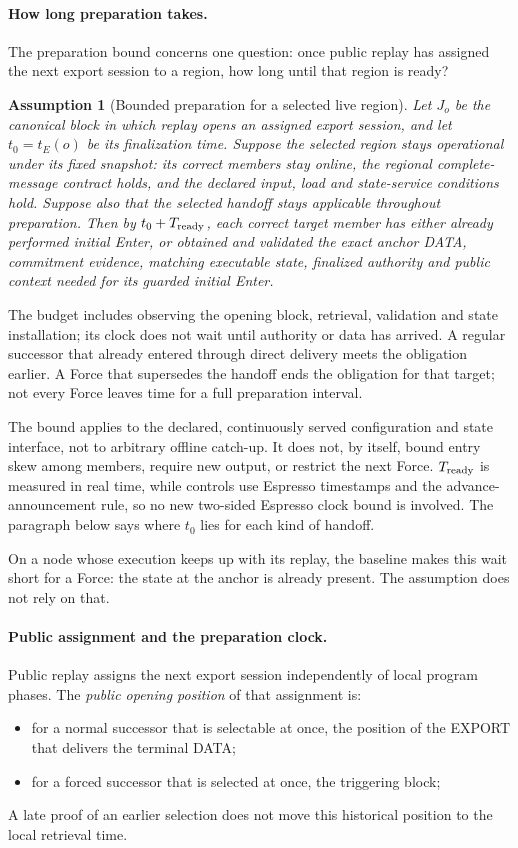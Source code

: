 \documentclass[11pt,a4paper]{article}
\newtheorem{assumption}[assumption]{Assumption}
\begin{document}
\paragraph{How long preparation takes.}
The preparation bound concerns one question: once public replay has
assigned the next export session to a region, how long until that region
is ready?

\begin{assumption}[Bounded preparation for a selected live region]
\label{ass:ready-service}
Let $J_o$ be the canonical block in which replay opens an assigned
export session, and let $t_0=t_E(o)$ be its finalization time.
Suppose the selected region stays operational under its fixed snapshot:
its correct members stay online, the regional complete-message contract
holds, and the declared input, load and state-service conditions hold.
Suppose also that the selected handoff stays applicable throughout
preparation. Then by $t_0+T_{\rm ready}$, each correct target member has
either already performed initial Enter, or obtained and validated the
exact anchor DATA, commitment evidence, matching executable state,
finalized authority and public context needed for its guarded initial
Enter.
\end{assumption}
The budget includes observing the opening block, retrieval, validation
and state installation; its clock does not wait until authority or data
has arrived. A regular successor that already entered through direct
delivery meets the obligation earlier. A Force that supersedes the
handoff ends the obligation for that target; not every Force leaves time
for a full preparation interval.

The bound applies to the declared, continuously served configuration and
state interface, not to arbitrary offline catch-up. It does not, by
itself, bound entry skew among members, require new output, or restrict
the next Force. $T_{\rm ready}$ is measured in real time, while controls
use Espresso timestamps and the advance-announcement rule, so no new
two-sided Espresso clock bound is involved. The paragraph below says where
$t_0$ lies for each kind of handoff.


On a node whose execution keeps up with its replay, the baseline makes
this wait short for a Force: the state at the anchor is already
present. The assumption does not rely on that.


\paragraph{Public assignment and the preparation clock.}
Public replay assigns the next export session independently of local
program phases. The \emph{public opening position} of that assignment is:
\begin{itemize}
\item for a normal successor that is selectable at once, the position of
the EXPORT that delivers the terminal DATA;
\item for a forced successor that is selected at once, the triggering
block;
\end{itemize}
A late proof of an earlier selection does not move this historical
position to the local retrieval time.
\end{document}
